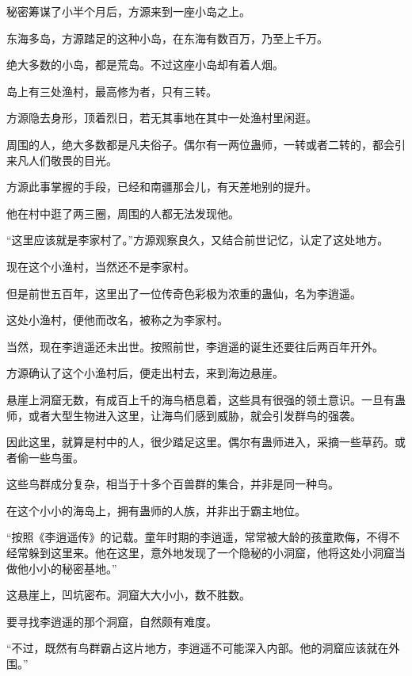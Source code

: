 
\begin{this_body}



秘密筹谋了小半个月后，方源来到一座小岛之上。

东海多岛，方源踏足的这种小岛，在东海有数百万，乃至上千万。

绝大多数的小岛，都是荒岛。不过这座小岛却有着人烟。

岛上有三处渔村，最高修为者，只有三转。

方源隐去身形，顶着烈日，若无其事地在其中一处渔村里闲逛。

周围的人，绝大多数都是凡夫俗子。偶尔有一两位蛊师，一转或者二转的，都会引来凡人们敬畏的目光。

方源此事掌握的手段，已经和南疆那会儿，有天差地别的提升。

他在村中逛了两三圈，周围的人都无法发现他。

“这里应该就是李家村了。”方源观察良久，又结合前世记忆，认定了这处地方。

现在这个小渔村，当然还不是李家村。

但是前世五百年，这里出了一位传奇色彩极为浓重的蛊仙，名为李逍遥。

这处小渔村，便他而改名，被称之为李家村。

当然，现在李逍遥还未出世。按照前世，李逍遥的诞生还要往后两百年开外。

方源确认了这个小渔村后，便走出村去，来到海边悬崖。

悬崖上洞窟无数，有成百上千的海鸟栖息着，这些具有很强的领土意识。一旦有蛊师，或者大型生物进入这里，让海鸟们感到威胁，就会引发群鸟的强袭。

因此这里，就算是村中的人，很少踏足这里。偶尔有蛊师进入，采摘一些草药。或者偷一些鸟蛋。

这些鸟群成分复杂，相当于十多个百兽群的集合，并非是同一种鸟。

在这个小小的海岛上，拥有蛊师的人族，并非出于霸主地位。

“按照《李逍遥传》的记载。童年时期的李逍遥，常常被大龄的孩童欺侮，不得不经常躲到这里来。他在这里，意外地发现了一个隐秘的小洞窟，他将这处小洞窟当做他小小的秘密基地。”

这悬崖上，凹坑密布。洞窟大大小小，数不胜数。

要寻找李逍遥的那个洞窟，自然颇有难度。

“不过，既然有鸟群霸占这片地方，李逍遥不可能深入内部。他的洞窟应该就在外围。”


\end{this_body}
